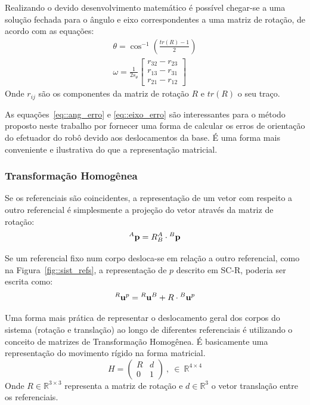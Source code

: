 Realizando o devido desenvolvimento matemático é possível chegar-se a uma
solução fechada para o ângulo e eixo correspondentes a uma matriz de rotação, de acordo com as
equações:
%
\begin{gather}
	\theta =  \cos^{-1}\left(\frac{tr(R) - 1}{2}\right) \label{eq::ang_erro} \\
	\omega = \frac{1}{2 s_\theta} \begin{bmatrix}
r_{32}-r_{23}\\ 
r_{13}-r_{31}\\ 
r_{21}-r_{12}
\end{bmatrix} \label{eq::eixo_erro}
\end{gather}
%
Onde $r_{ij}$ são os componentes da matriz de rotação $R$ e $tr(R)$ o seu
traço.

As equações~\ref{eq::ang_erro} e \ref{eq::eixo_erro} são interessantes para o
método proposto neste trabalho por fornecer uma forma de calcular os erros de
orientação do efetuador do robô devido aos deslocamentos da base. É uma forma
mais conveniente e ilustrativa do que a representação matricial.



\subsubsection{Transformação Homogênea}

Se os referenciais são coincidentes, a representação de um vetor com respeito a
outro referencial é simplesmente a projeção do vetor através da matriz de
rotação:
%
\begin{equation}
^{A}\textrm{\textbf{p}} = R_{B}^{A} \cdot {}^{B}\textrm{\textbf{p}}
\end{equation}
%

Se um referencial fixo num corpo desloca-se em relação a outro referencial, como
na Figura~\ref{fig::sist_refs}, a representação de $p$ descrito em SC-R, poderia
ser escrita como:
%
\begin{equation} \label{eq::upemr}
	^{R}\textrm{\textbf{u}}^{p} = {}^{R}\textrm{\textbf{u}}^{B} + R \cdot
	{}^{B}\textrm{\textbf{u}}^{p}
\end{equation}
%

Uma forma mais prática de representar o deslocamento geral dos corpos do sistema
(rotação e translação) ao longo de diferentes referenciais é utilizando o
conceito de matrizes de Transformação Homogênea. É basicamente uma representação
do movimento rígido na forma matricial. 
\begin{equation}
	H = 
\begin{pmatrix}
R & d\\ 
0 & 1
\end{pmatrix} ~,~ \in ~ \mathbb{R}^{4\times4}
\end{equation}
%
Onde $R \in \mathbb{R}^{3\times3}$ representa a matriz de rotação e $d \in
\mathbb{R}^{3}$ o vetor translação entre os referenciais.

